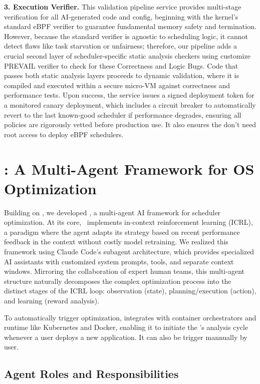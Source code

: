 \textbf{3. Execution Verifier.} This validation pipeline service provides multi-stage verification for all AI-generated code and config, beginning with the kernel's standard eBPF verifier to guarantee fundamental memory safety and termination. However, because the standard verifier is agnostic to scheduling logic, it cannot detect flaws like task starvation or unfairness; therefore, our pipeline adds a crucial second layer of scheduler-specific static analysis checkers using customize PREVAIL verifier\cite{prevail} to check for these Correctness and Logic Bugs. Code that passes both static analysis layers proceeds to dynamic validation, where it is compiled and executed within a secure micro-VM against correctness and performance tests. Upon success, the service issues a signed deployment token for a monitored canary deployment, which includes a circuit breaker to automatically revert to the last known-good scheduler if performance degrades, ensuring all policies are rigorously vetted before production use. It also ensures the \agent don't need root access to deploy eBPF schedulers.

\section{\agent: A Multi-Agent Framework for OS Optimization}
\label{sec:sched_agents}

Building on \sys, we developed \textbf{\agent}, a multi-agent AI framework for scheduler optimization. At its core, \agent\ implements in-context reinforcement learning (ICRL)\cite{incontextrl}, a paradigm where the agent adapts its strategy based on recent performance feedback in the context without costly model retraining. We realized this framework using Claude Code's subagent architecture\cite{anthropic2024subagents}, which provides specialized AI assistants with customized system prompts, tools, and separate context windows\cite{anthropic2024multiagent}. Mirroring the collaboration of expert human teams, this multi-agent structure naturally decomposes the complex optimization process into the distinct stages of the ICRL loop: observation (state), planning/execution (action), and learning (reward analysis).

To automatically trigger optimization, \sys integrates with container orchestrators and runtime like Kubernetes and Docker, enabling it to initiate the \agent's analysis cycle whenever a user deploys a new application. It can also be trigger mannually by user.

\subsection{Agent Roles and Responsibilities}

